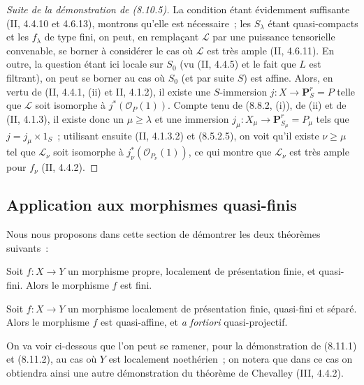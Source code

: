 \begin{proof}[Suite de la démonstration de (8.10.5)]
La condition étant évidemment suffisante (II, 4.4.10 et 4.6.13), montrons
qu'elle est nécessaire~; les $S_\lambda$ étant quasi-compacts et les
$f_\lambda$ de type fini, on peut, en remplaçant $\mathcal L$ par une puissance
tensorielle convenable, se borner à considérer le cas où $\mathcal L$ est très
ample (II, 4.6.11). En outre, la question étant ici locale sur $S_0$ (vu
(II, 4.4.5) et le fait que $L$ est filtrant), on peut se borner au cas où
$S_0$ (et par suite $S$) est affine. Alors, en vertu de (II, 4.4.1, (ii) et
II, 4.1.2), il existe une $S$-immersion
$j:X\to\mathbf P_S^r=P$ telle que $\mathcal L$ soit isomorphe à
$j^*(\mathcal O_P(1))$. Compte tenu de (8.8.2, (i)), de (ii) et de
(II, 4.1.3), il existe donc un $\mu\geq\lambda$ et une immersion
$j_\mu:X_\mu\to\mathbf P_{S_\mu}^r=P_\mu$ tels que
$j=j_\mu\times1_S$~; utilisant ensuite (II, 4.1.3.2) et (8.5.2.5), on voit
qu'il existe $\nu\geq\mu$ tel que $\mathcal L_\nu$ soit isomorphe à
$j_\nu^*(\mathcal O_{P_\nu}(1))$, ce qui montre que $\mathcal L_\nu$ est très
ample pour $f_\nu$ (II, 4.4.2).
\end{proof}

\subsection{Application aux morphismes quasi-finis}
\label{subsection:IV.8.11-fr}
\label{IV.8.11-fr}

Nous nous proposons dans cette section de démontrer les deux théorèmes
suivants~:

\begin{theorem}[8.11.1]
Soit $f:X\to Y$ un morphisme propre, localement de présentation finie, et
quasi-fini. Alors le morphisme $f$ est fini.
\end{theorem}

\begin{theorem}[8.11.2]
\label{IV.8.11.2-fr}
Soit $f:X\to Y$ un morphisme localement de présentation finie, quasi-fini et
séparé. Alors le morphisme $f$ est quasi-affine, et \emph{a fortiori}
quasi-projectif.
\end{theorem}

\begin{remark}[8.11.3]
\label{IV.8.11.3-fr}
On va voir ci-dessous que l'on peut se ramener, pour la démonstration de
(8.11.1) et (8.11.2), au cas où $Y$ est localement noethérien~; on notera que
dans ce cas on obtiendra ainsi une autre démonstration du théorème de
Chevalley (III, 4.4.2).
\end{remark}

